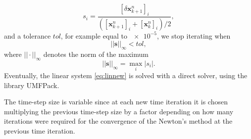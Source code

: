\begin{equation}
	s_i = \frac{[\delta \mathbf{x}^n_{k+1}]_i}{([\mathbf{x}^n_{k+1}]_i + [\mathbf{x}^n_{k}]_i) / 2},
\end{equation}
and a tolerance $tol$, for example equal to $\num{e-5}$, we stop iterating when
\begin{equation}
	|\!|\mathbf{s}|\!|_\infty < tol,
\end{equation}
where $|\!| \cdot |\!|_	\infty$ denotes the norm of the maximum
\begin{equation}
	|\!|\mathbf{s}|\!|_\infty = \max_i |s_i|.
\end{equation}
Eventually, the linear system \eqref{eq:linnew} is solved with a direct solver, using the library UMFPack.

The time-step size is variable since at each new time iteration it is chosen 
multiplying the previous time-step size by a factor depending on how many iterations were required for the 
convergence of the Newton's method at the previous time iteration.